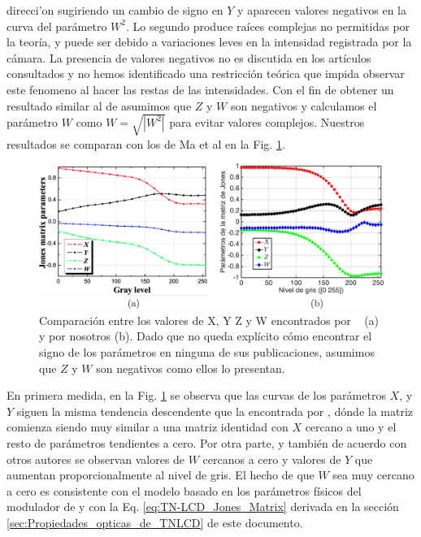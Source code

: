 direcci'on sugiriendo un cambio de signo en $Y$ y aparecen valores negativos
en la curva del parámetro $W^2$. Lo segundo produce raíces complejas no
permitidas por la teoría, y puede ser debido a variaciones leves
en la intensidad registrada por la cámara. La presencia de
valores negativos no es discutida en los artículos consultados y no
hemos identificado una restricción teórica que impida observar este
fenomeno al hacer las restas de las intensidades. Con el fin de
obtener un resultado similar al de  asumimos
  que $Z$ y $W$ son negativos y calculamos el parámetro $W$ como
  $W=\sqrt{|W^2|}$ para evitar valores complejos. Nuestros
  resultados se comparan con los de Ma et al en la Fig. \ref{fig:Ma_and_our_XYZW}.
\begin{figure}[h!]
\includegraphics[scale = .26]{Ma_and_our_XYZW.pdf}
\caption[Comparación entre los valores de $X$, $Y$ $Z$ y $W$ encontrados por
Ma et al.~ para un SLM similar y por nosotros.]{Comparación entre los
  valores de X, Y Z y W encontrados por ~ 
  (a) y por nosotros (b). Dado que no queda explícito cómo encontrar
  el signo de los parámetros en ninguna de sus publicaciones, asumimos
  que $Z$ y $W$ son negativos como ellos lo presentan.}   
\label{fig:Ma_and_our_XYZW}
\end{figure}
En primera medida, en la Fig. \ref{fig:Ma_and_our_XYZW} se observa que
las curvas de los parámetros $X$, y 
$Y$ siguen la misma tendencia descendente que la encontrada por
, dónde la matriz comienza siendo muy similar a
una matriz identidad con $X$ cercano a uno y el resto de parámetros
tendientes a cero. Por otra parte, y también de acuerdo con otros
autores  se observan valores de $W$
cercanos a cero y valores de $Y$ 
que aumentan proporcionalmente al nivel de gris. El hecho de que $W$
sea muy cercano a cero es consistente con el modelo basado en los
parámetros físicos del modulador de
 y con la
Eq. \ref{eq:TN-LCD_Jones_Matrix} derivada en la sección
\ref{sec:Propiedades_opticas_de_TNLCD} de este documento. 

